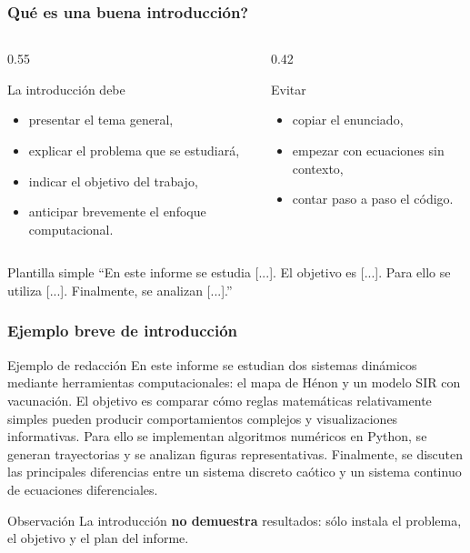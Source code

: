 \begin{frame}
\frametitle{\textquestiondown{}Qu\'e es una buena introducci\'on?}
\begin{columns}[T]
\begin{column}{0.55\textwidth}
\begin{block}{La introducci\'on debe}
\begin{itemize}
    \item presentar el tema general,
    \item explicar el problema que se estudiar\'a,
    \item indicar el objetivo del trabajo,
    \item anticipar brevemente el enfoque computacional.
\end{itemize}
\end{block}
\end{column}
\begin{column}{0.42\textwidth}
\begin{block}{Evitar}
\begin{itemize}
    \item copiar el enunciado,
    \item empezar con ecuaciones sin contexto,
    \item contar paso a paso el c\'odigo.
\end{itemize}
\end{block}
\end{column}
\end{columns}

\vspace{0.25cm}
\begin{alertblock}{Plantilla simple}
``En este informe se estudia [...]. El objetivo es [...]. Para ello se utiliza [...]. Finalmente, se analizan [...].''
\end{alertblock}
\end{frame}

\begin{frame}
\frametitle{Ejemplo breve de introducci\'on}
\small
\begin{block}{Ejemplo de redacci\'on}
En este informe se estudian dos sistemas din\'amicos mediante herramientas computacionales: el mapa de H\'enon y un modelo SIR con vacunaci\'on. El objetivo es comparar c\'omo reglas matem\'aticas relativamente simples pueden producir comportamientos complejos y visualizaciones informativas. Para ello se implementan algoritmos num\'ericos en Python, se generan trayectorias y se analizan figuras representativas. Finalmente, se discuten las principales diferencias entre un sistema discreto ca\'otico y un sistema continuo de ecuaciones diferenciales.
\end{block}

\vspace{0.2cm}
\begin{alertblock}{Observaci\'on}
La introducci\'on \textbf{no demuestra} resultados: s\'olo instala el problema, el objetivo y el plan del informe.
\end{alertblock}
\end{frame}

